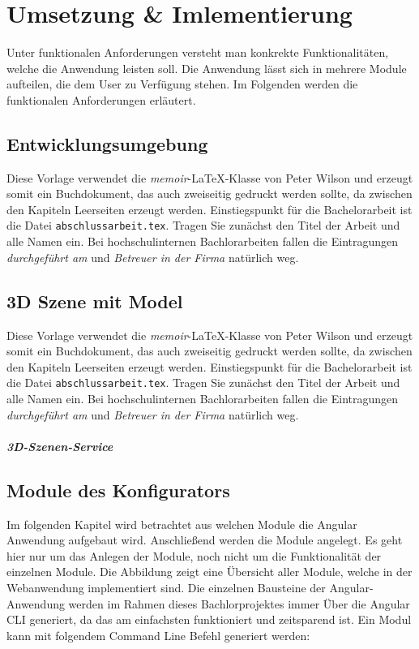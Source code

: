 %
%
%
\chapter{Umsetzung \& Imlementierung}
\label{cha:umsetzung}
%
Unter funktionalen Anforderungen versteht man konkrekte Funktionalitäten, welche die Anwendung leisten soll. Die Anwendung lässt sich in mehrere Module aufteilen, die dem User zu Verfügung stehen. Im Folgenden werden die funktionalen Anforderungen erläutert.
\section{Entwicklungsumgebung}
\label{sec:umsetzung}
%
Diese Vorlage verwendet die \textit{memoir}-LaTeX-Klasse von Peter Wilson und erzeugt somit ein Buchdokument, das auch zweiseitig gedruckt werden sollte, da zwischen den Kapiteln Leerseiten erzeugt werden. Einstiegspunkt für die Bachelorarbeit ist die Datei \texttt{abschlussarbeit.tex}. Tragen Sie zunächst den Titel der Arbeit und alle Namen ein. Bei hochschulinternen Bachlorarbeiten fallen die Eintragungen \textit{durchgeführt am} und \textit{Betreuer in der Firma} natürlich weg.
%
\section{3D Szene mit Model}
\label{sec:umsetzung}
%
Diese Vorlage verwendet die \textit{memoir}-LaTeX-Klasse von Peter Wilson und erzeugt somit ein Buchdokument, das auch zweiseitig gedruckt werden sollte, da zwischen den Kapiteln Leerseiten erzeugt werden. Einstiegspunkt für die Bachelorarbeit ist die Datei \texttt{abschlussarbeit.tex}. Tragen Sie zunächst den Titel der Arbeit und alle Namen ein. Bei hochschulinternen Bachlorarbeiten fallen die Eintragungen \textit{durchgeführt am} und \textit{Betreuer in der Firma} natürlich weg.
\paragraph{3D-Szenen-Service}

\section{Module des Konfigurators}
\label{sec:umsetzung}
%
Im folgenden Kapitel wird betrachtet aus welchen Module die Angular Anwendung aufgebaut wird. Anschließend werden die Module angelegt. Es geht hier nur um das Anlegen der Module, noch nicht um die Funktionalität der einzelnen Module. Die Abbildung zeigt eine Übersicht aller Module, welche in der Webanwendung implementiert sind.
Die einzelnen Bausteine der Angular-Anwendung werden im Rahmen dieses Bachlorprojektes immer Über die Angular CLI generiert, da das am einfachsten funktioniert und zeitsparend ist. Ein Modul kann mit folgendem Command Line Befehl generiert werden:\\

